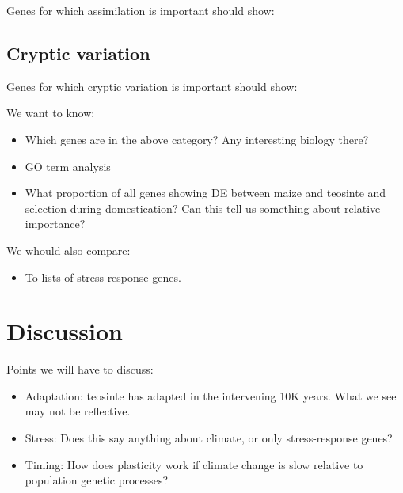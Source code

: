 \documentclass{article}
\begin{document}
Genes for which assimilation is important should show:

\subsection{Cryptic variation}
Genes for which cryptic variation is important should show:

We want to know:
\begin{itemize}
\item Which genes are in the above category? Any interesting biology there?
\item GO term analysis %
\item What proportion of all genes showing DE between maize and teosinte and selection during domestication? Can this tell us something about relative importance?
\end{itemize}

We whould also compare:
\begin{itemize}
\item To lists of stress response genes.
\end{itemize}

\section{Discussion}


Points we will have to discuss: %
\begin{itemize}
\item Adaptation: teosinte has adapted in the intervening 10K years. What we see may not be reflective.
\item Stress: Does this say anything about climate, or only stress-response genes?
\item Timing: How does plasticity work if climate change is slow relative to population genetic processes?
\end{itemize}



\end{document}
